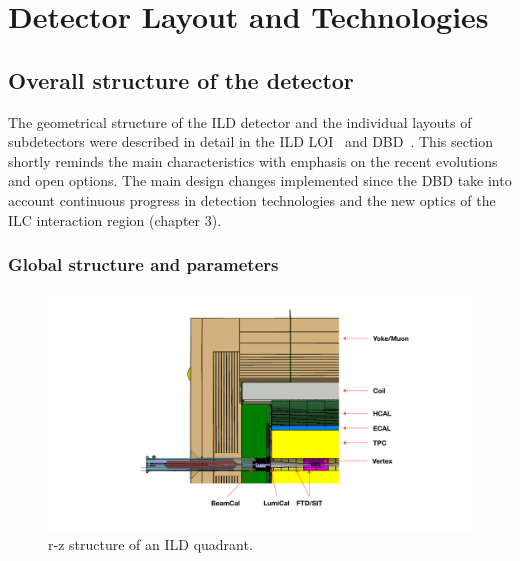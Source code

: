\newcommand{\ilds}[1]{{\em#1}$^s$} %

\chapter{Detector Layout and Technologies}




\section{Overall structure of the detector}

The geometrical structure of the ILD detector and the individual layouts of subdetectors were described in detail in the ILD LOI~\cite{ild:bib:ILDloi} and DBD~\cite{ild:bib:ILDDBD}. This section shortly reminds the main characteristics with emphasis on the recent evolutions and open options. The main design changes implemented since the DBD take into account continuous progress in detection technologies and the new optics of the ILC interaction region (chapter 3). 


\subsection{Global structure and parameters}


\begin{figure}[t!]
\centering
\includegraphics[width=0.9\hsize]{Detector/fig/ILD_quadrant_new_lstar.pdf}
\caption{r-z structure of an ILD quadrant.}
\label{fig:det:quad}
\end{figure}

